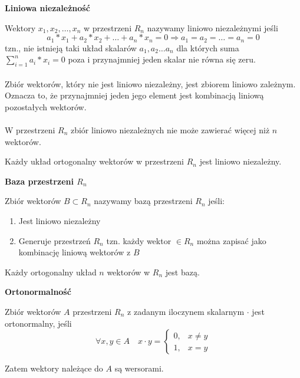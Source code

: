 \documentclass[12pt]{article}
\begin{document}
    \begin{definition}
        \textbf{Liniowa niezależność}

        Wektory $x_1, x_2 ,\dots, x_n$ w przestrzeni $R_n$ nazywamy liniowo niezależnymi jeśli
        \[a_1 * x_1 + a_2 * x_2 + \ldots + a_n * x_n = 0 \Rightarrow a_1 = a_2 = \ldots = a_n = 0\]
        tzn., nie istnieją taki układ skalarów $a_1, a_2 \ldots a_n$ dla których suma $\sum_{i=1}^{n}{a_i * x_i} = 0$ poza i przynajmniej jeden skalar nie równa się zeru. \\~\\

        Zbiór wektorów, który nie jest liniowo niezależny, jest zbiorem liniowo zależnym. Oznacza to, że przynajmniej jeden jego element jest kombinacją liniową pozostałych wektorów. \\~\\

        W przestrzeni $R_n$ zbiór liniowo niezależnych nie może zawierać więcej niż $n$ wektorów.

    \end{definition}

    \begin{theorem}
        Każdy układ ortogonalny wektorów w przestrzeni $R_n$ jest liniowo niezależny.
    \end{theorem}

    \begin{definition}

        \textbf{Baza przestrzeni $R_n$}

        Zbiór wektorów $B \subset R_n$ nazywamy bazą przestrzeni $R_n$ jeśli:

        \begin{enumerate}
            \item Jest liniowo niezależny
            \item Generuje przestrzeń $R_n$ tzn. każdy wektor $\in R_n$ można zapisać jako kombinację liniową wektorów z $B$
        \end{enumerate}

    \end{definition}

    \begin{theorem}
        Każdy ortogonalny układ $n$ wektorów w $R_n$ jest bazą.
    \end{theorem}

    \begin{definition}
        \textbf{Ortonormalność}

        Zbiór wektorów $A$ przestrzeni $R_n$ z zadanym iloczynem skalarnym $\cdot$ jest ortonormalny, jeśli
        \[ \forall x,y \in A  \quad   x \cdot y =  \begin{cases}
                                                       0, & x \ne y \\
                                                       1, & x = y
        \end{cases}\]

        Zatem wektory należące do $A$ są wersorami.
    \end{definition}
\end{document}
